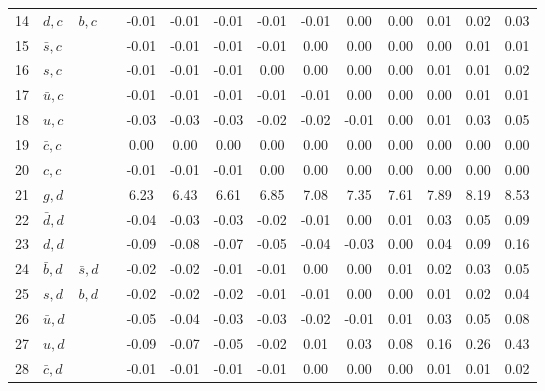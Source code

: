 \begin{tabularx}{\textwidth}{rXXX@{}S@{}S@{}S@{}S@{}S@{}S@{}S@{}S@{}S@{}S}
 14 & $d, c$           & $b, c$            &                  & -0.01 & -0.01 & -0.01 & -0.01 & -0.01 &  0.00 &  0.00 &  0.01 &  0.02 &  0.03 \\
 15 & $\bar s, c$      &                   &                  & -0.01 & -0.01 & -0.01 & -0.01 &  0.00 &  0.00 &  0.00 &  0.00 &  0.01 &  0.01 \\
 16 & $s, c$           &                   &                  & -0.01 & -0.01 & -0.01 &  0.00 &  0.00 &  0.00 &  0.00 &  0.01 &  0.01 &  0.02 \\
 17 & $\bar u, c$      &                   &                  & -0.01 & -0.01 & -0.01 & -0.01 & -0.01 &  0.00 &  0.00 &  0.00 &  0.01 &  0.01 \\
 18 & $u, c$           &                   &                  & -0.03 & -0.03 & -0.03 & -0.02 & -0.02 & -0.01 &  0.00 &  0.01 &  0.03 &  0.05 \\
 19 & $\bar c, c$      &                   &                  &  0.00 &  0.00 &  0.00 &  0.00 &  0.00 &  0.00 &  0.00 &  0.00 &  0.00 &  0.00 \\
 20 & $c, c$           &                   &                  & -0.01 & -0.01 & -0.01 &  0.00 &  0.00 &  0.00 &  0.00 &  0.00 &  0.00 &  0.00 \\
 21 & $g, d$           &                   &                  &  6.23 &  6.43 &  6.61 &  6.85 &  7.08 &  7.35 &  7.61 &  7.89 &  8.19 &  8.53 \\
 22 & $\bar d, d$      &                   &                  & -0.04 & -0.03 & -0.03 & -0.02 & -0.01 &  0.00 &  0.01 &  0.03 &  0.05 &  0.09 \\
 23 & $d, d$           &                   &                  & -0.09 & -0.08 & -0.07 & -0.05 & -0.04 & -0.03 &  0.00 &  0.04 &  0.09 &  0.16 \\
 24 & $\bar b, d$      & $\bar s, d$       &                  & -0.02 & -0.02 & -0.01 & -0.01 &  0.00 &  0.00 &  0.01 &  0.02 &  0.03 &  0.05 \\
 25 & $s, d$           & $b, d$            &                  & -0.02 & -0.02 & -0.02 & -0.01 & -0.01 &  0.00 &  0.00 &  0.01 &  0.02 &  0.04 \\
 26 & $\bar u, d$      &                   &                  & -0.05 & -0.04 & -0.03 & -0.03 & -0.02 & -0.01 &  0.01 &  0.03 &  0.05 &  0.08 \\
 27 & $u, d$           &                   &                  & -0.09 & -0.07 & -0.05 & -0.02 &  0.01 &  0.03 &  0.08 &  0.16 &  0.26 &  0.43 \\
 28 & $\bar c, d$      &                   &                  & -0.01 & -0.01 & -0.01 & -0.01 &  0.00 &  0.00 &  0.00 &  0.01 &  0.01 &  0.02 \\

\end{tabularx}
